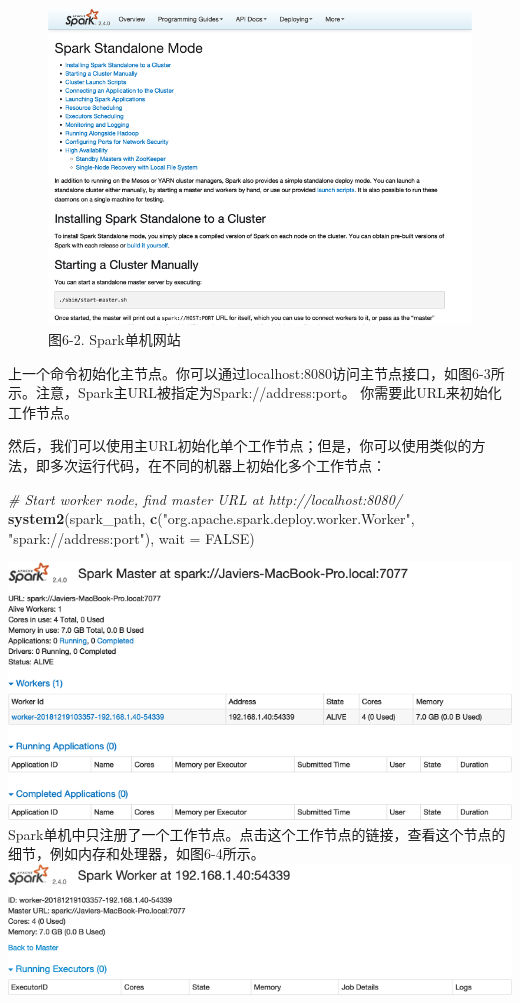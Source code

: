 \documentclass[
]{article}
\newenvironment{Shaded}{\begin{snugshade}}{\end{snugshade}}
\newcommand{\CommentTok}[1]{\textcolor[rgb]{0.56,0.35,0.01}{\textit{#1}}}
\newcommand{\DataTypeTok}[1]{\textcolor[rgb]{0.13,0.29,0.53}{#1}}
\newcommand{\KeywordTok}[1]{\textcolor[rgb]{0.13,0.29,0.53}{\textbf{#1}}}
\newcommand{\NormalTok}[1]{#1}
\newcommand{\OtherTok}[1]{\textcolor[rgb]{0.56,0.35,0.01}{#1}}
\newcommand{\StringTok}[1]{\textcolor[rgb]{0.31,0.60,0.02}{#1}}
\begin{document}
\begin{figure}
\centering
\includegraphics{figures/6_2.png}
\caption{图6-2. Spark单机网站}
\end{figure}

上一个命令初始化主节点。你可以通过localhost:8080访问主节点接口，如图6-3所示。注意，Spark主URL被指定为Spark://address:port。
你需要此URL来初始化工作节点。

然后，我们可以使用主URL初始化单个工作节点；但是，你可以使用类似的方法，即多次运行代码，在不同的机器上初始化多个工作节点：

\begin{Shaded}
\begin{Highlighting}[]
\CommentTok{# Start worker node, find master URL at http://localhost:8080/}
\KeywordTok{system2}\NormalTok{(spark_path, }\KeywordTok{c}\NormalTok{(}\StringTok{"org.apache.spark.deploy.worker.Worker"}\NormalTok{, }\StringTok{"spark://address:port"}\NormalTok{), }
    \DataTypeTok{wait =} \OtherTok{FALSE}\NormalTok{)}
\end{Highlighting}
\end{Shaded}

\includegraphics{figures/6_3.png}
Spark单机中只注册了一个工作节点。点击这个工作节点的链接，查看这个节点的细节，例如内存和处理器，如图6-4所示。
\includegraphics{figures/6_4.png}
\end{document}
